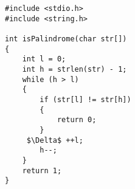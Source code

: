 
\begin{lstlisting}[style=CStyle, caption=Equivalent mutant for the function isPalindrome., label=isPalindrome_equivalent, mathescape=true]
#include <stdio.h> 
#include <string.h> 

int isPalindrome(char str[]) 
{ 
    int l = 0; 
    int h = strlen(str) - 1; 
    while (h > l) 
    { 
        if (str[l] != str[h]) 
        { 
            return 0;
        } 
     $\Delta$ ++l;
        h--;
    } 
    return 1; 
} 
\end{lstlisting}
